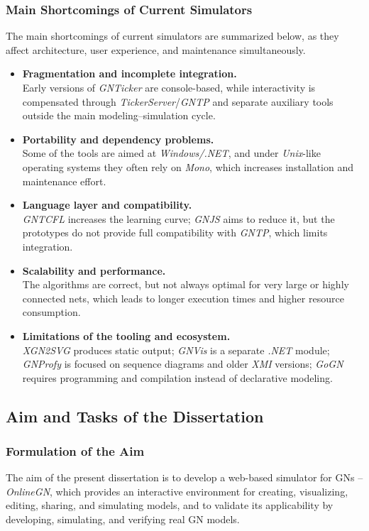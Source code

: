 \subsubsection{Main Shortcomings of Current Simulators}

\hspace*{2.5em}The main shortcomings of current simulators are summarized below, as they affect architecture, user experience, and maintenance simultaneously.

\begin{itemize}
	\item \textbf{Fragmentation and incomplete integration.}\\
	Early versions of \textit{GNTicker} are console-based, while interactivity is compensated through \textit{TickerServer}/\textit{GNTP} and separate auxiliary tools outside the main modeling--simulation cycle.
	\item \textbf{Portability and dependency problems.}\\
	Some of the tools are aimed at \textit{Windows/.NET}, and under \textit{Unix}-like operating systems they often rely on \textit{Mono}, which increases installation and maintenance effort.
	\item \textbf{Language layer and compatibility.}\\
	\textit{GNTCFL} increases the learning curve; \textit{GNJS} aims to reduce it, but the prototypes do not provide full compatibility with \textit{GNTP}, which limits integration.
	\item \textbf{Scalability and performance.}\\
	The algorithms are correct, but not always optimal for very large or highly connected nets, which leads to longer execution times and higher resource consumption.
	\item \textbf{Limitations of the tooling and ecosystem.}\\
	\textit{XGN2SVG} produces static output; \textit{GNVis} is a separate \textit{.NET} module; \textit{GNProfy} is focused on sequence diagrams and older \textit{XMI} versions; \textit{GoGN} requires programming and compilation instead of declarative modeling.
\end{itemize}
\subsection{Aim and Tasks of the Dissertation}

\subsubsection{Formulation of the Aim}
\hspace*{2.5em}The aim of the present dissertation is to develop a web-based simulator for GNs -- \textit{OnlineGN}, which provides an interactive environment for creating, visualizing, editing, sharing, and simulating models, and to validate its applicability by developing, simulating, and verifying real GN models.

